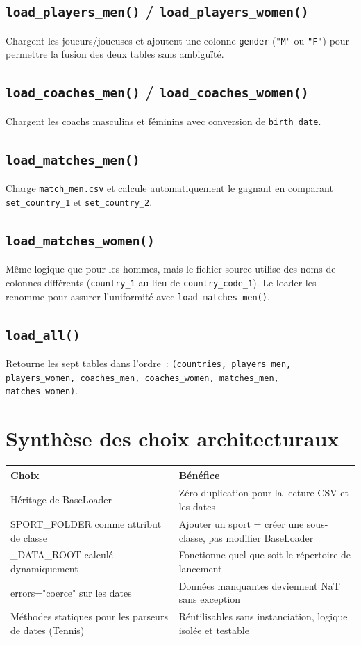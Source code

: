 \documentclass[12pt,a4paper]{article}
\begin{document}
\subsection{\texttt{load\_players\_men()} / \texttt{load\_players\_women()}}
Chargent les joueurs/joueuses et ajoutent une colonne \texttt{gender}
(\texttt{"M"} ou \texttt{"F"}) pour permettre la fusion des deux tables sans
ambiguïté.

\subsection{\texttt{load\_coaches\_men()} / \texttt{load\_coaches\_women()}}
Chargent les coachs masculins et féminins avec conversion de \texttt{birth\_date}.

\subsection{\texttt{load\_matches\_men()}}
Charge \texttt{match\_men.csv} et calcule automatiquement le gagnant en
comparant \texttt{set\_country\_1} et \texttt{set\_country\_2}.

\subsection{\texttt{load\_matches\_women()}}
Même logique que pour les hommes, mais le fichier source utilise des noms de
colonnes différents (\texttt{country\_1} au lieu de \texttt{country\_code\_1}).
Le loader les renomme pour assurer l'uniformité avec \texttt{load\_matches\_men()}.

\subsection{\texttt{load\_all()}}
Retourne les sept tables dans l'ordre~: \texttt{(countries, players\_men,
players\_women, coaches\_men, coaches\_women, matches\_men, matches\_women)}.

\section{Synthèse des choix architecturaux}

\begin{center}
\begin{tabular}{>{\ttfamily}p{5.5cm} p{8cm}}
\toprule
\textbf{Choix} & \textbf{Bénéfice} \\
\midrule
Héritage de BaseLoader & Zéro duplication pour la lecture CSV et les dates \\
SPORT\_FOLDER comme attribut de classe & Ajouter un sport = créer une sous-classe, pas modifier BaseLoader \\
\_DATA\_ROOT calculé dynamiquement & Fonctionne quel que soit le répertoire de lancement \\
errors="coerce" sur les dates & Données manquantes deviennent NaT sans exception \\
Méthodes statiques pour les parseurs de dates (Tennis) & Réutilisables sans instanciation, logique isolée et testable \\
\bottomrule
\end{tabular}
\end{center}
\end{document}
